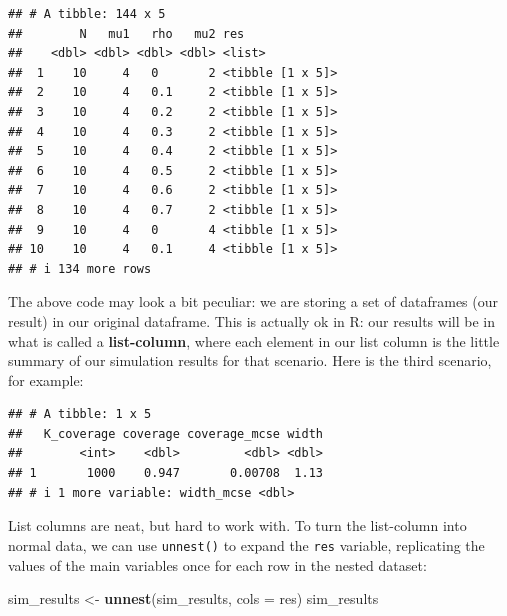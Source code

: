 \documentclass[
]{book}
\newenvironment{Shaded}{\begin{snugshade}}{\end{snugshade}}
\newcommand{\AttributeTok}[1]{\textcolor[rgb]{0.13,0.29,0.53}{#1}}
\newcommand{\DecValTok}[1]{\textcolor[rgb]{0.00,0.00,0.81}{#1}}
\newcommand{\FunctionTok}[1]{\textcolor[rgb]{0.13,0.29,0.53}{\textbf{#1}}}
\newcommand{\NormalTok}[1]{#1}
\newcommand{\OtherTok}[1]{\textcolor[rgb]{0.56,0.35,0.01}{#1}}
\newcommand{\SpecialCharTok}[1]{\textcolor[rgb]{0.81,0.36,0.00}{\textbf{#1}}}
\begin{document}
\begin{verbatim}
## # A tibble: 144 x 5
##        N   mu1   rho   mu2 res             
##    <dbl> <dbl> <dbl> <dbl> <list>          
##  1    10     4   0       2 <tibble [1 x 5]>
##  2    10     4   0.1     2 <tibble [1 x 5]>
##  3    10     4   0.2     2 <tibble [1 x 5]>
##  4    10     4   0.3     2 <tibble [1 x 5]>
##  5    10     4   0.4     2 <tibble [1 x 5]>
##  6    10     4   0.5     2 <tibble [1 x 5]>
##  7    10     4   0.6     2 <tibble [1 x 5]>
##  8    10     4   0.7     2 <tibble [1 x 5]>
##  9    10     4   0       4 <tibble [1 x 5]>
## 10    10     4   0.1     4 <tibble [1 x 5]>
## # i 134 more rows
\end{verbatim}

The above code may look a bit peculiar: we are storing a set of dataframes (our result) in our original dataframe.
This is actually ok in R: our results will be in what is called a \textbf{list-column}, where each element in our list column is the little summary of our simulation results for that scenario.
Here is the third scenario, for example:

\begin{Shaded}
\end{Shaded}

\begin{verbatim}
## # A tibble: 1 x 5
##   K_coverage coverage coverage_mcse width
##        <int>    <dbl>         <dbl> <dbl>
## 1       1000    0.947       0.00708  1.13
## # i 1 more variable: width_mcse <dbl>
\end{verbatim}

List columns are neat, but hard to work with.
To turn the list-column into normal data, we can use \texttt{unnest()} to expand the \texttt{res} variable, replicating the values of the main variables once for each row in the nested dataset:

\begin{Shaded}
\begin{Highlighting}[]
\NormalTok{sim\_results }\OtherTok{\textless{}{-}} \FunctionTok{unnest}\NormalTok{(sim\_results, }\AttributeTok{cols =}\NormalTok{ res)}
\NormalTok{sim\_results}
\end{Highlighting}
\end{Shaded}
\end{document}
